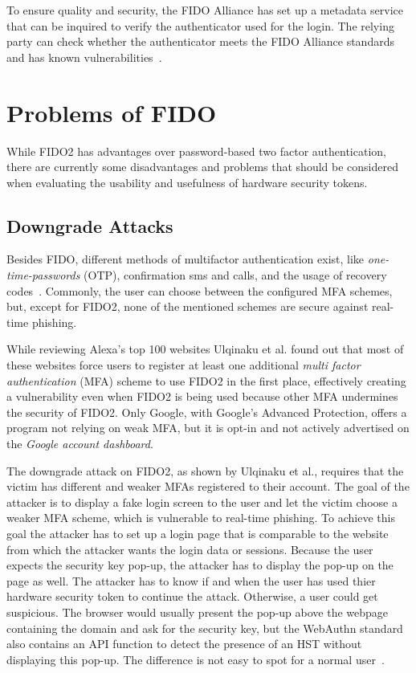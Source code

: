 \documentclass[runningheads]{llncs}
\begin{document}
To ensure quality and security, the FIDO Alliance has set up a metadata service that can be inquired to verify the authenticator used for the login. The relying party can check whether the authenticator meets the FIDO Alliance standards and has known vulnerabilities~\cite{9099190}.

\section{Problems of FIDO}
While FIDO2 has advantages over password-based two factor authentication, there are currently some disadvantages and problems that should be considered when evaluating the usability and usefulness of hardware security tokens.

\subsection{Downgrade Attacks}
Besides FIDO, different methods of multifactor authentication exist, like \textit{one-time-passwords} (OTP), confirmation sms and calls, and the usage of recovery codes~\cite{000004}. Commonly, the user can choose between the configured MFA schemes, but, except for FIDO2, none of the mentioned schemes are secure against real-time phishing. 

While reviewing Alexa's top 100 websites Ulqinaku et al. found out that most of these websites force users to register at least one additional \textit{multi factor authentication} (MFA) scheme to use FIDO2 in the first place, effectively creating a vulnerability even when FIDO2 is being used because other MFA undermines the security of FIDO2. Only Google, with Google's Advanced Protection, offers a program not relying on weak MFA, but it is opt-in and not actively advertised on the \textit{Google account dashboard}.

The downgrade attack on FIDO2, as shown by Ulqinaku et al., requires that the victim has different and weaker MFAs registered to their account. The goal of the attacker is to display a fake login screen to the user and let the victim choose a weaker MFA scheme, which is vulnerable to real-time phishing. To achieve this goal the attacker has to set up a login page that is comparable to the website from which the attacker wants the login data or sessions. Because the user expects the security key pop-up, the attacker has to display the pop-up on the page as well. The attacker has to know if and when the user has used thier hardware security token to continue the attack. Otherwise, a user could get suspicious. The browser would usually present the pop-up above the webpage containing the domain and ask for the security key, but the WebAuthn standard also contains an API function to detect the presence of an HST without displaying this pop-up. The difference is not easy to spot for a normal user~\cite{274610}.
\end{document}
